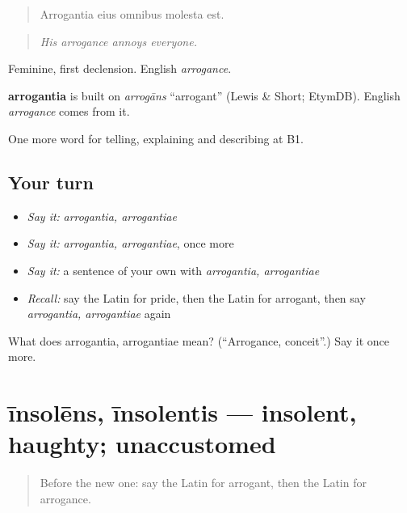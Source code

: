 \begin{quote}
Arrogantia eius omnibus molesta est.
\end{quote}

\begin{quote}
\emph{His arrogance annoys everyone.}
\end{quote}

Feminine, first declension. English \emph{arrogance}.

\begin{cousinweb}
\textbf{arrogantia} is built on \emph{arrogāns} \textquotedblleft{}arrogant\textquotedblright{} (Lewis \& Short; EtymDB). English \emph{arrogance} comes from it.
\end{cousinweb}

\begin{grammarlens}[title={What you've built}]
One more word for telling, explaining and describing at B1.
\end{grammarlens}

\subsection*{Your turn}
\begin{itemize}
\raggedright
  \item \emph{Say it:} \emph{arrogantia, arrogantiae}
  \item \emph{Say it:} \emph{arrogantia, arrogantiae}, once more
  \item \emph{Say it:} a sentence of your own with \emph{arrogantia, arrogantiae}
  \item \emph{Recall:} say the Latin for pride, then the Latin for arrogant, then say \emph{arrogantia, arrogantiae} again
\end{itemize}

\begin{tcolorbox}[breakable,colback=teal!4,colframe=teal!35!black,title={Before you move on}]
What does arrogantia, arrogantiae mean? (\textquotedblleft{}Arrogance, conceit\textquotedblright{}.) Say it once more.
\end{tcolorbox}
\section[īnsolēns, īnsolentis]{īnsolēns, īnsolentis — insolent, haughty; unaccustomed}

\label{lesson:LA-C507-insolens}



\begin{quote}
Before the new one: say the Latin for arrogant, then the Latin for arrogance.
\end{quote}

